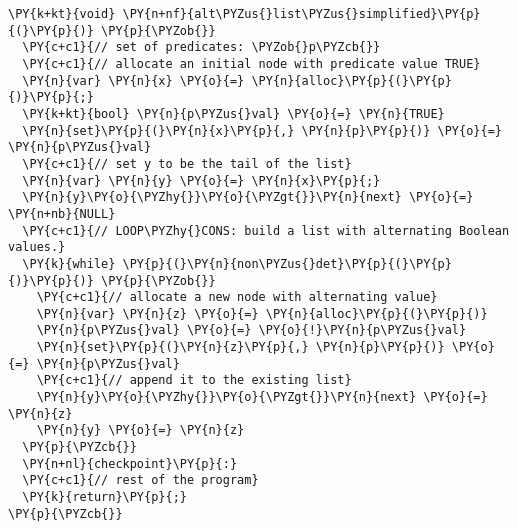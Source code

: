 \begin{Verbatim}[commandchars=\\\{\},codes={\catcode`\$=3\catcode`\^=7\catcode`\_=8}]
\PY{k+kt}{void} \PY{n+nf}{alt\PYZus{}list\PYZus{}simplified}\PY{p}{(}\PY{p}{)} \PY{p}{\PYZob{}}
  \PY{c+c1}{// set of predicates: \PYZob{}p\PYZcb{}}
  \PY{c+c1}{// allocate an initial node with predicate value TRUE}
  \PY{n}{var} \PY{n}{x} \PY{o}{=} \PY{n}{alloc}\PY{p}{(}\PY{p}{)}\PY{p}{;}
  \PY{k+kt}{bool} \PY{n}{p\PYZus{}val} \PY{o}{=} \PY{n}{TRUE}
  \PY{n}{set}\PY{p}{(}\PY{n}{x}\PY{p}{,} \PY{n}{p}\PY{p}{)} \PY{o}{=} \PY{n}{p\PYZus{}val}
  \PY{c+c1}{// set y to be the tail of the list}
  \PY{n}{var} \PY{n}{y} \PY{o}{=} \PY{n}{x}\PY{p}{;}
  \PY{n}{y}\PY{o}{\PYZhy{}}\PY{o}{\PYZgt{}}\PY{n}{next} \PY{o}{=} \PY{n+nb}{NULL}
  \PY{c+c1}{// LOOP\PYZhy{}CONS: build a list with alternating Boolean values.}
  \PY{k}{while} \PY{p}{(}\PY{n}{non\PYZus{}det}\PY{p}{(}\PY{p}{)}\PY{p}{)} \PY{p}{\PYZob{}}
    \PY{c+c1}{// allocate a new node with alternating value}
    \PY{n}{var} \PY{n}{z} \PY{o}{=} \PY{n}{alloc}\PY{p}{(}\PY{p}{)}
    \PY{n}{p\PYZus{}val} \PY{o}{=} \PY{o}{!}\PY{n}{p\PYZus{}val}
    \PY{n}{set}\PY{p}{(}\PY{n}{z}\PY{p}{,} \PY{n}{p}\PY{p}{)} \PY{o}{=} \PY{n}{p\PYZus{}val}
    \PY{c+c1}{// append it to the existing list}
    \PY{n}{y}\PY{o}{\PYZhy{}}\PY{o}{\PYZgt{}}\PY{n}{next} \PY{o}{=} \PY{n}{z}
    \PY{n}{y} \PY{o}{=} \PY{n}{z}
  \PY{p}{\PYZcb{}}
  \PY{n+nl}{checkpoint}\PY{p}{:}
  \PY{c+c1}{// rest of the program}
  \PY{k}{return}\PY{p}{;}
\PY{p}{\PYZcb{}}
\end{Verbatim}
